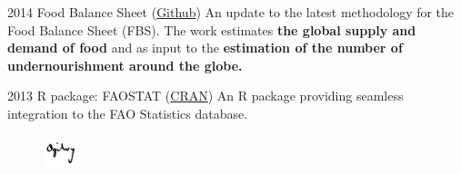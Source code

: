 \documentclass{tccv}
\begin{document}
\begin{yearlist}

  
\item{2014} {Food Balance Sheet
  (\href{https://github.com/SWS-Methodology}{Github})} {An update to
  the latest methodology for the Food Balance Sheet (FBS). The work
  estimates \textbf{the global supply and demand of food} and as input
  to the \textbf{estimation of the number of undernourishment around
    the globe.}}
  



\item{2013}
     {R package: FAOSTAT
       (\href{http://cran.r-project.org/web/packages/FAOSTAT/index.html}{CRAN})}
     {An R package providing seamless integration to the FAO
       Statistics database.}
  
\end{yearlist}


\begin{figure}[h!] %
  \centering
  \includegraphics[width=1cm,height=1cm]{../company_icon/ogilvy.jpg}
\end{figure}
\end{document}
